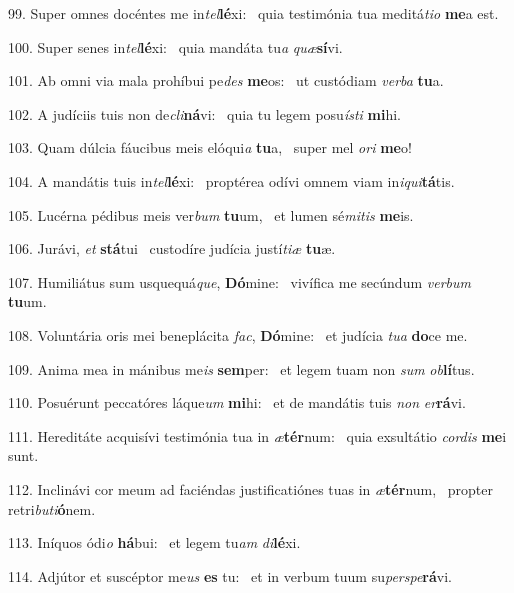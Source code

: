 99. Super omnes docéntes me in\textit{tel}\textbf{lé}xi: \ast\  quia testimónia tua meditá\textit{ti}\textit{o} \textbf{me}a est.\

100. Super senes in\textit{tel}\textbf{lé}xi: \ast\  quia mandáta tu\textit{a} \textit{quæ}\textbf{sí}vi.\

101. Ab omni via mala prohíbui pe\textit{des} \textbf{me}os: \ast\  ut custódiam \textit{ver}\textit{ba} \textbf{tu}a.\

102. A judíciis tuis non de\textit{cli}\textbf{ná}vi: \ast\  quia tu legem posu\textit{ís}\textit{ti} \textbf{mi}hi.\

103. Quam dúlcia fáucibus meis elóqui\textit{a} \textbf{tu}a, \ast\  super mel \textit{o}\textit{ri} \textbf{me}o!\

104. A mandátis tuis in\textit{tel}\textbf{lé}xi: \ast\  proptérea odívi omnem viam in\textit{i}\textit{qui}\textbf{tá}tis.\

105. Lucérna pédibus meis ver\textit{bum} \textbf{tu}um, \ast\  et lumen sé\textit{mi}\textit{tis} \textbf{me}is.\

106. Jurávi, \textit{et} \textbf{stá}tui \ast\  custodíre judícia justí\textit{ti}\textit{æ} \textbf{tu}æ.\

107. Humiliátus sum usquequá\textit{que}, \textbf{Dó}mine: \ast\  vivífica me secúndum \textit{ver}\textit{bum} \textbf{tu}um.\

108. Voluntária oris mei beneplácita \textit{fac}, \textbf{Dó}mine: \ast\  et judícia \textit{tu}\textit{a} \textbf{do}ce me.\

109. Anima mea in mánibus me\textit{is} \textbf{sem}per: \ast\  et legem tuam non \textit{sum} \textit{ob}\textbf{lí}tus.\

110. Posuérunt peccatóres láque\textit{um} \textbf{mi}hi: \ast\  et de mandátis tuis \textit{non} \textit{er}\textbf{rá}vi.\

111. Hereditáte acquisívi testimónia tua in \textit{æ}\textbf{tér}num: \ast\  quia exsultátio \textit{cor}\textit{dis} \textbf{me}i sunt.\

112. Inclinávi cor meum ad faciéndas justificatiónes tuas in \textit{æ}\textbf{tér}num, \ast\  propter retri\textit{bu}\textit{ti}\textbf{ó}nem.\

113. Iníquos ódi\textit{o} \textbf{há}bui: \ast\  et legem tu\textit{am} \textit{di}\textbf{lé}xi.\

114. Adjútor et suscéptor me\textit{us} \textbf{es} tu: \ast\  et in verbum tuum su\textit{per}\textit{spe}\textbf{rá}vi.\

